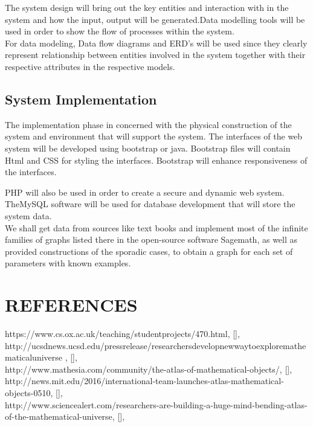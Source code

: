 \documentclass[11pt]{article} %
\begin{document}
The system design will bring out the key entities and interaction with in the system and how the input, output will be generated.Data modelling tools will be used in order to show the flow of processes within the system.\\ For data modeling, Data flow diagrams and ERD's will be used since they clearly represent relationship between entities involved in the system together with their respective attributes in the respective models. 
\subsection{System Implementation}
The implementation phase in concerned with the physical construction of the system and environment that will support the system.
The interfaces of the web system will be developed using bootstrap or java. Bootstrap files will contain Html and CSS for styling the interfaces. Bootstrap will enhance responsiveness of the interfaces. 

PHP will also be used in order to create a secure and dynamic web system. \\TheMySQL software will be used for database development that will store the system data.\\ 
We shall get data from sources like text books and implement most of the infinite families of graphs listed there in the open-source software Sagemath, as well as provided constructions of the sporadic cases, to obtain a graph for each set of parameters with known examples.
\section{REFERENCES}

{{https://www.cs.ox.ac.uk/teaching/studentprojects/470.html},
	[],
} \\
{{http://ucsdnews.ucsd.edu/pressrelease/researchersdevelopnewwaytoexploremathematicaluniverse}		,
	[],
} \\
{{http://www.mathesia.com/community/the-atlas-of-mathematical-objects/},
	[],
} \\
{{http://news.mit.edu/2016/international-team-launches-atlas-mathematical-objects-0510},
	[],
} \\
{{http://www.sciencealert.com/researchers-are-building-a-huge-mind-bending-atlas-of-the-mathematical-universe},
	[],
} \\
\end{document}
